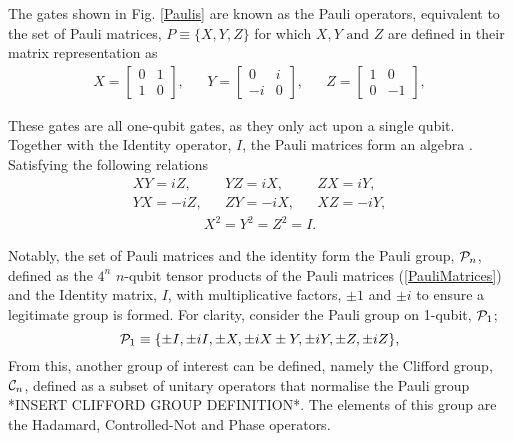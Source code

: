 The gates shown in Fig. \ref{Paulis} are known as the Pauli operators, equivalent
to the set of Pauli matrices, $P \equiv \{X, Y, Z\}$ for which $X, Y \text{ and } Z$ are defined in their matrix representation as
\begin{align}
    \label{PauliMatrices}
    X = \begin{bmatrix}
            0 & 1 \\
            1 & 0
        \end{bmatrix},
     &  &
    Y = \begin{bmatrix}
            0  & i \\
            -i & 0
        \end{bmatrix},
     &  &
    Z = \begin{bmatrix}
            1 & 0  \\
            0 & -1
        \end{bmatrix},
\end{align}

These gates are all one-qubit gates, as they only act upon a single qubit.
Together with the Identity operator, $I$, the Pauli matrices form an algebra .
Satisfying the following relations
\begin{align}
    XY = iZ,  &  & YZ = iX,  &  & ZX = iY,  \\
    YX = -iZ, &  & ZY = -iX, &  & XZ = -iY,
\end{align}
\begin{align}
    X^2 = Y^2 = Z^2 = I.
\end{align}

Notably, the set of Pauli matrices and the identity form
the Pauli group, ${\cal P}_n$, defined as the $4^n$ $n$-qubit tensor products of the Pauli matrices (\ref{PauliMatrices}) and the
Identity matrix, $I$, with multiplicative factors, $\pm 1$ and $\pm i$ to ensure a legitimate group is formed.
For clarity, consider the Pauli group on 1-qubit, ${\cal P}_1$;
\begin{equation}
    {\cal P}_1 \equiv \{ \pm I, \pm iI, \pm X, \pm iX \pm Y, \pm iY, \pm Z, \pm iZ\},
\end{equation}
From this, another group of interest can be defined, namely the Clifford group, ${\cal C}_n$, defined as a
subset of unitary operators that normalise the Pauli group \cite{orthogonalcodes} *INSERT CLIFFORD GROUP DEFINITION*.
The elements of this group are the
Hadamard, Controlled-Not and Phase operators.

